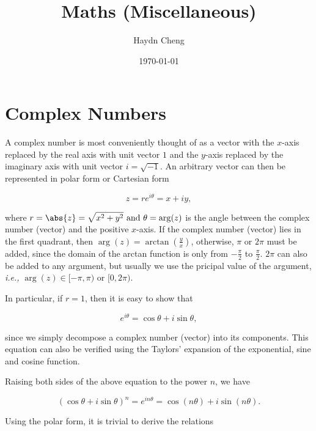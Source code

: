 \documentclass[english,a4paper,12pt]{report}
\title{Maths (Miscellaneous)}
\author{Haydn Cheng}
\date{\today}
\begin{document}
\maketitle
\tableofcontents

\chapter{Complex Numbers}

A complex number is most conveniently thought of as a vector with the \(x\)-axis replaced by the real axis with unit vector \(1\) and the \(y\)-axis replaced by the imaginary axis with unit vector \(i = \sqrt{-1} \). An arbitrary vector can then be represented in polar form or Cartesian form

\begin{equation}
	z = re^{i \theta } = x + iy, 
\end{equation}

where \(\displaystyle r = \abs{z} = \sqrt{x^2 + y^2} \text { and } \theta = \arg (z)\) is the angle between the complex number (vector) and the positive \(x\)-axis. If the complex number (vector) lies in the first quadrant, then \(\arg (z) = \displaystyle \arctan {\left(\frac{y}{x} \right)} \), otherwise, \(\pi \text { or } 2\pi \) must be added, since the domain of the arctan function is only from \(\displaystyle -\frac{\pi }{2} \) to \(\displaystyle \frac{\pi }{2} \). \(2\pi \) can also be added to any argument, but usually we use the pricipal value of the argument, \textit{i.e.,} \(\arg (z) \in [-\pi , \pi ) \text { or } [0,2\pi )\).   

In particular, if \(r=1\), then it is easy to show that 

\begin{equation}
	e^{i \theta } = \cos \theta + i\sin \theta ,
\end{equation}

since we simply decompose a complex number (vector) into its components. This equation can also be verified using the Taylors' expansion of the exponential, sine and cosine function.

Raising both sides of the above equation to the power \(n\), we have

\begin{equation}
	(\cos \theta + i \sin \theta )^{n} = e^{i n \theta } = \cos (n \theta ) + i \sin (n \theta ).
\end{equation}

Using the polar form, it is trivial to derive the relations
\end{document}
